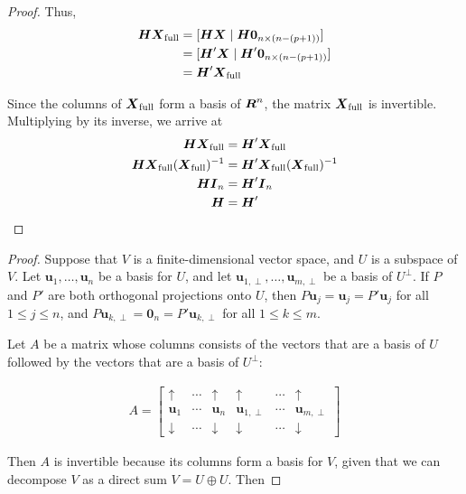 \documentclass[12pt]{article}
\begin{document}
\begin{enumerate}
\begin{proof}
Thus,
\begin{align*}
	\boldsymbol{H}\boldsymbol{X}_{\text{full}}
	&=[\boldsymbol{H}\boldsymbol{X} \mid \boldsymbol{H}\mathbf{0}_{n\times (n-(p+1))}]\\
	&=[\boldsymbol{H}'\boldsymbol{X} \mid \boldsymbol{H}'\mathbf{0}_{n\times (n-(p+1))}]\\
	&=\boldsymbol{H}'\boldsymbol{X}_{\text{full}}
\end{align*}

Since the columns of $\boldsymbol{X}_{\text{full}}$ form a basis of $\boldsymbol{R}^n$, the
matrix $\boldsymbol{X}_{\text{full}}$ is invertible. Multiplying by its inverse, we arrive at
\begin{align*}
	\boldsymbol{H}\boldsymbol{X}_{\text{full}}&=\boldsymbol{H}'\boldsymbol{X}_{\text{full}}\\
	\boldsymbol{H}\boldsymbol{X}_{\text{full}}(\boldsymbol{X}_{\text{full}})^{-1}&=\boldsymbol{H}'\boldsymbol{X}_{\text{full}}(\boldsymbol{X}_{\text{full}})^{-1}\\
	\boldsymbol{H}\boldsymbol{I}_n&=\boldsymbol{H}'\boldsymbol{I}_{n}\\
	\boldsymbol{H}&=\boldsymbol{H}'
\end{align*}
	
\end{proof}


\begin{proof}
	Suppose that $V$ is a finite-dimensional vector space, and $U$ is a subspace
	of $V$. Let $\mathbf{u}_1,\ldots,\mathbf{u}_n$ be a basis for $U$,
	and let $\mathbf{u}_{1,\perp},\ldots,\mathbf{u}_{m,\perp}$ be a basis of
	$U^\perp$. If $P$ and $P'$ are both orthogonal projections onto $U$,
	then $P\mathbf{u}_j=\mathbf{u}_j=P'\mathbf{u}_j$ for all $1\leq j\leq n$, and
	$P\mathbf{u}_{k,\perp}=\mathbf{0}_n=P'\mathbf{u}_{k,\perp}$ for all $1\leq k\leq m$.

	Let $A$ be a matrix whose columns consists of the vectors that are
	a basis of $U$ followed by the vectors that are a basis of $U^\perp$:
	
	\begin{align*}
		A = \begin{bmatrix}
			\uparrow & \cdots & \uparrow & \uparrow & \cdots& \uparrow\\
			\mathbf{u}_1 & \cdots & \mathbf{u}_n & \mathbf{u}_{1,\perp} & \cdots & \mathbf{u}_{m, \perp}\\
			\downarrow & \cdots & \downarrow& \downarrow& \cdots& \downarrow
		\end{bmatrix}
	\end{align*}
	
	Then $A$ is invertible because its columns form a basis for $V$, given that
	we can decompose $V$ as a direct sum $V=U\oplus U$. Then
	

\end{proof}
\end{enumerate}
\end{document}
